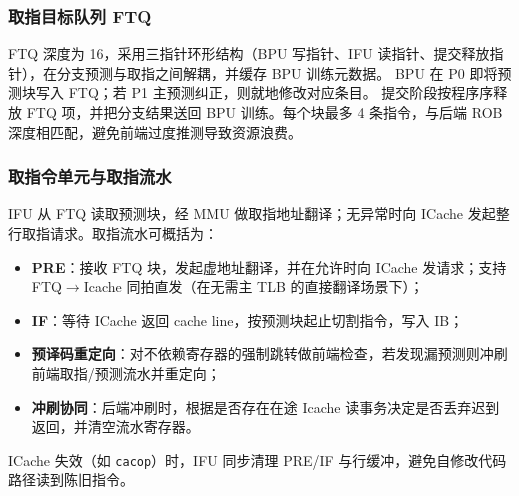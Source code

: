 \subsubsection{取指目标队列 FTQ}

FTQ 深度为 16，采用三指针环形结构（BPU 写指针、IFU 读指针、提交释放指针），在分支预测与取指之间解耦，并缓存 BPU 训练元数据。
BPU 在 P0 即将预测块写入 FTQ；若 P1 主预测纠正，则就地修改对应条目。
提交阶段按程序序释放 FTQ 项，并把分支结果送回 BPU 训练。每个块最多 4 条指令，与后端 ROB 深度相匹配，避免前端过度推测导致资源浪费。

\subsubsection{取指令单元与取指流水}

IFU 从 FTQ 读取预测块，经 MMU 做取指地址翻译；无异常时向 ICache 发起整行取指请求。取指流水可概括为：

\begin{itemize}
  \item \textbf{PRE}：接收 FTQ 块，发起虚地址翻译，并在允许时向 ICache 发请求；支持 FTQ$\rightarrow$Icache 同拍直发（在无需主 TLB 的直接翻译场景下）；
  \item \textbf{IF}：等待 ICache 返回 cache line，按预测块起止切割指令，写入 IB；
  \item \textbf{预译码重定向}：对不依赖寄存器的强制跳转做前端检查，若发现漏预测则冲刷前端取指/预测流水并重定向；
  \item \textbf{冲刷协同}：后端冲刷时，根据是否存在在途 Icache 读事务决定是否丢弃迟到返回，并清空流水寄存器。
\end{itemize}

ICache 失效（如 \texttt{cacop}）时，IFU 同步清理 PRE/IF 与行缓冲，避免自修改代码路径读到陈旧指令。
